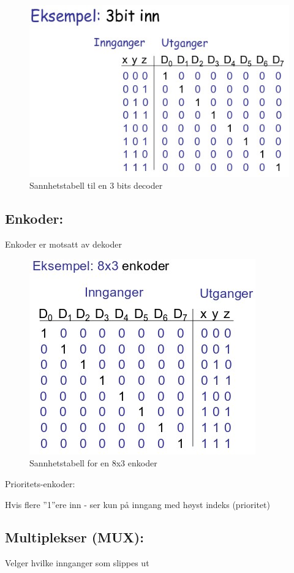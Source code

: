 \documentclass{article}
\begin{document}
	\begin{figure}[H]
		\includegraphics[scale = 0.6]{decoder.jpg}
		\caption{Sannhetstabell til en 3 bits decoder}
	\end{figure}
	
	\subsection{Enkoder:}
	Enkoder er motsatt av dekoder
	
	\begin{figure}[H]
		\includegraphics[scale = 0.6]{enkoder.jpg}
		\caption{Sannhetstabell for en 8x3 enkoder}
	\end{figure}
	
	Prioritets-enkoder:
	
	Hvis flere ”1”ere inn - ser kun på inngang med høyst indeks (prioritet) 
	
	
	\subsection{Multiplekser (MUX):}
	Velger hvilke  innganger som slippes ut
	
\end{document}
